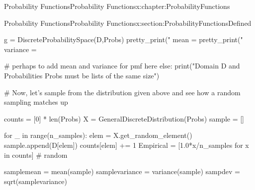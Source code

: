 \documentclass[oneside,10pt,]{book}
\numberwithin{equation}{section}
\begin{document}
\begin{chapterptx}{Probability Functions}{}{Probability Functions}{}{}{x:chapter:ProbabilityFunctions}
\begin{sectionptx}{Probability Functions}{}{Probability Functions}{}{}{x:section:ProbabilityFunctionsDefined}
\begin{sageinput}
            g = DiscreteProbabilitySpace(D,Probs)
            pretty_print("     mean = %
            pretty_print(" variance = %
    
        #  perhaps to add mean and variance for pmf here
        else:
            print("Domain D and Probabilities Probs must be lists of the same size")
    
    #  Now, let's sample from the distribution given above and see how a random sampling matches up

        counts = [0] * len(Probs)
        X = GeneralDiscreteDistribution(Probs)
        sample = []

        for _ in range(n_samples):
            elem = X.get_random_element()
            sample.append(D[elem])
            counts[elem] += 1
        Empirical = [1.0*x/n_samples for x in counts] # random
    
        samplemean = mean(sample)
        samplevariance = variance(sample)
        sampdev = sqrt(samplevariance)
    

\end{sageinput}
\end{sectionptx}
\end{chapterptx}
\end{document}
